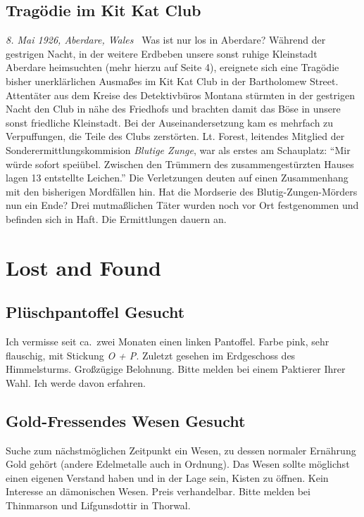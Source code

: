 \documentclass[final]{multiversum}
\begin{document}
\subsection{Tragödie im Kit Kat Club}
\textit{8. Mai 1926, Aberdare, Wales} \textendash\ Was ist nur los in Aberdare?
Während der gestrigen Nacht, in der weitere Erdbeben unsere sonst ruhige
Kleinstadt Aberdare heimsuchten (mehr hierzu auf Seite 4), ereignete sich eine
Tragödie bisher unerklärlichen Ausmaßes im Kit Kat Club in der Bartholomew
Street. Attentäter aus dem Kreise des Detektivbüros Montana stürmten in der
gestrigen Nacht den Club in nähe des Friedhofs und brachten damit das Böse in
unsere sonst friedliche Kleinstadt. Bei der Auseinandersetzung kam es mehrfach
zu Verpuffungen, die Teile des Clubs zerstörten. Lt. Forest, leitendes Mitglied
der Sonderermittlungskommision \emph{Blutige Zunge}, war als erstes am
Schauplatz: \enquote{Mir würde sofort speiübel. Zwischen den Trümmern des
zusammengestürzten Hauses lagen 13 entstellte Leichen.} Die Verletzungen deuten
auf einen Zusammenhang mit den bisherigen Mordfällen hin. Hat die Mordserie des
Blutig-Zungen-Mörders nun ein Ende? Drei mutmaßlichen Täter wurden noch vor Ort
festgenommen und befinden sich in Haft. Die Ermittlungen dauern an.


\section{Lost and Found}
\subsection{Plüschpantoffel Gesucht}
Ich vermisse seit ca.\ zwei Monaten einen linken Pantoffel.  Farbe pink, sehr
flauschig, mit Stickung \emph{O + P}.  Zuletzt gesehen im Erdgeschoss des
Himmelsturms.  Großzügige Belohnung.  Bitte melden bei einem Paktierer Ihrer Wahl.
Ich werde davon erfahren.

\subsection{Gold-Fressendes Wesen Gesucht}
Suche zum nächstmöglichen Zeitpunkt ein Wesen, zu dessen normaler Ernährung Gold
gehört (andere Edelmetalle auch in Ordnung). Das Wesen sollte möglichst einen
eigenen Verstand haben und in der Lage sein, Kisten zu öffnen.  Kein Interesse
an dämonischen Wesen.  Preis verhandelbar.  Bitte melden bei Thinmarson und
Lifgunsdottir in Thorwal.
\end{document}
